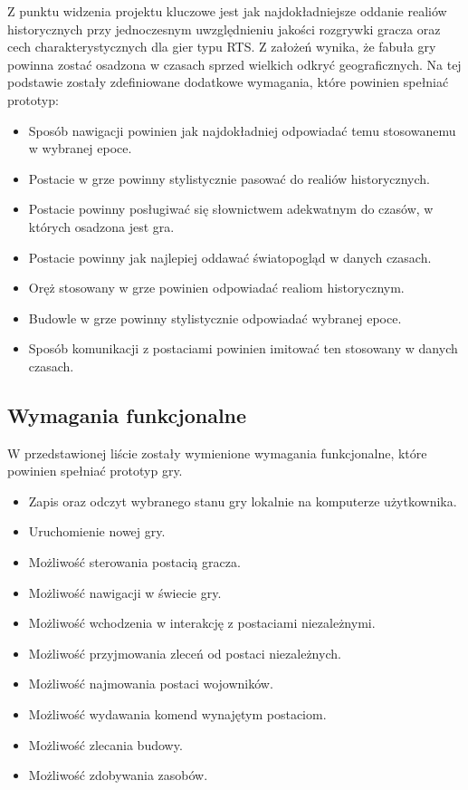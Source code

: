 Z punktu widzenia projektu kluczowe jest jak najdokładniejsze oddanie realiów historycznych przy jednoczesnym
uwzględnieniu jakości rozgrywki gracza oraz cech charakterystycznych dla gier typu RTS. Z założeń wynika, że fabuła
gry powinna zostać osadzona w czasach sprzed wielkich odkryć geograficznych. Na tej podstawie zostały zdefiniowane
dodatkowe wymagania, które powinien spełniać prototyp:
\begin{itemize}
  \item Sposób nawigacji powinien jak najdokładniej odpowiadać temu stosowanemu w wybranej epoce.
  \item Postacie w grze powinny stylistycznie pasować do realiów historycznych.
  \item Postacie powinny posługiwać się słownictwem adekwatnym do czasów, w których osadzona jest gra.
  \item Postacie powinny jak najlepiej oddawać światopogląd w danych czasach.
  \item Oręż stosowany w grze powinien odpowiadać realiom historycznym.
  \item Budowle w grze powinny stylistycznie odpowiadać wybranej epoce.
  \item Sposób komunikacji z postaciami powinien imitować ten stosowany w danych czasach.
\end{itemize}

\subsection{Wymagania funkcjonalne}\label{ss:fun}
W przedstawionej liście zostały wymienione wymagania funkcjonalne, które powinien spełniać prototyp gry.

\begin{itemize}\label{list:fun}
  \item Zapis oraz odczyt wybranego stanu gry lokalnie na komputerze użytkownika.
  \item Uruchomienie nowej gry.
  \item Możliwość sterowania postacią gracza.
  \item Możliwość nawigacji w świecie gry.
  \item Możliwość wchodzenia w interakcję z postaciami niezależnymi.
  \item Możliwość przyjmowania zleceń od postaci niezależnych.
  \item Możliwość najmowania postaci wojowników.
  \item Możliwość wydawania komend wynajętym postaciom.
  \item Możliwość zlecania budowy.
  \item Możliwość zdobywania zasobów.
\end{itemize}

